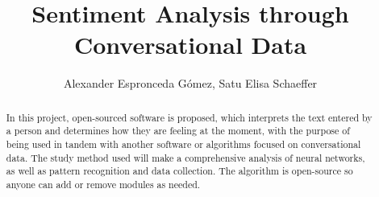 \documentclass[a4]{sciposter}
\title{Sentiment Analysis through Conversational Data}
\author{Alexander Espronceda Gómez, Satu Elisa Schaeffer}
\institute {Facultad de Ingeniería Mecánica y Eléctrica}
\begin{document}

\maketitle
\begin{abstract}
In this project, open-sourced software is proposed, which interprets the text entered by a person and determines how they are feeling at the moment, with the purpose of being used in tandem with another software or algorithms focused on conversational data.
The study method used will make a comprehensive analysis of neural networks, as well as pattern recognition and data collection.
The algorithm is open-source so anyone can add or remove modules as needed.
\end{abstract}
\end{document}
